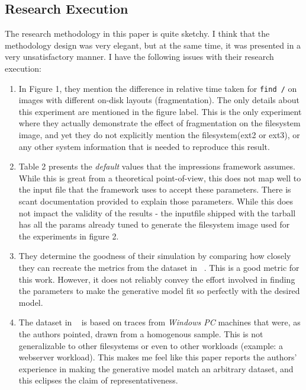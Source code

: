 \subsection{Research Execution}\label{sssec:re} The research methodology in this paper is quite sketchy. I think that the methodology design was very elegant, but at the same time, it was presented in a very unsatisfactory manner. I have the following issues with their research execution:
\begin{enumerate}[nosep]
    \item In Figure 1, they mention the difference in relative time taken for \texttt{find /} on images with different on-disk layouts (fragmentation). The only details about this experiment are mentioned in the figure label. This is the only experiment where they actually demonstrate the effect of fragmentation on the filesystem image, and yet they do not explicitly mention the filesystem(ext2 or ext3), or any other system information that is needed to reproduce this result. 
    \item Table 2 presents the \emph{default} values that the impressions framework assumes. While this is great from a theoretical point-of-view, this does not map well to the input file that the framework uses to accept these parameters. There is scant documentation provided to explain those parameters. While this does not impact the validity of the results - the inputfile shipped with the tarball has all the params already tuned to generate the filesystem image used for the experiments in figure 2.
    \item They determine the goodness of their simulation by comparing how closely they can recreate the metrics from the dataset in ~\cite{agrawal2007five}. This is a good metric for this work. However, it does not reliably convey the effort involved in finding the parameters to make the generative model fit so perfectly with the desired model. 
    \item The dataset in ~\cite{agrawal2007five} is based on traces from \emph{Windows PC} machines that were, as the authors pointed, drawn from a homogenous sample. This is not generalizable to other filesystems or even to other workloads (example: a webserver workload). This makes me feel like this paper reports the authors' experience in making the generative model match an arbitrary dataset, and this eclipses the claim of representativeness.
\end{enumerate}

